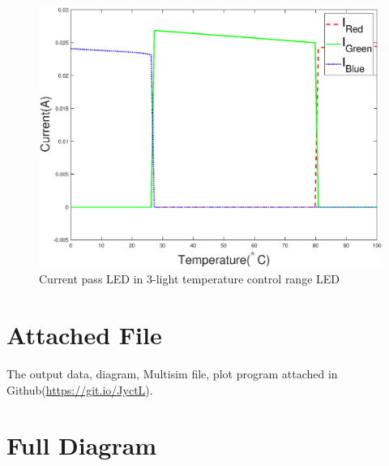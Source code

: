 \documentclass[12pt]{article}
\numberwithin{equation}{section}
\begin{document}
\begin{figure}[H] %
\centering %
\includegraphics[width=\textwidth]{3_range_diagram} %
\caption{Current pass LED in 3-light temperature control range LED} %
\label{Fig.3light_diagram} %
\end{figure}




\newpage




\appendix

\section{Attached File}
The output data, diagram, Multisim file, plot program attached in Github(\href{https://git.io/JyctL}{https://git.io/JyctL}).  



\section{Full Diagram}
\end{document}
